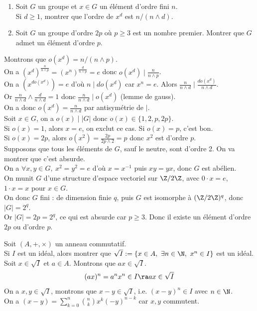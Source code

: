 \documentclass[11pt]{article}
\begin{document}
\begin{exercice}{}{}
    \begin{enumerate}
        \item Soit $G$ un groupe et $x\in G$ un élément d'ordre fini $n$.\\
        Si $d\geq1$, montrer que l'ordre de $x^d$ est $n/(n\land d)$.
        \item Soit $G$ un groupe d'ordre $2p$ où $p\geq3$ est un nombre premier. Montrer que $G$ admet un élément d'ordre $p$.
    \end{enumerate}
    \tcblower
     Montrons que $o(x^d) = n/(n\land p)$.\\
    On a $\left(x^d\right)^{\frac{n}{n\land p}} = (x^n)^{\frac{d}{n\land p}}=e$ donc $o(x^d) \mid \frac{n}{n\land p}$.\\
    On a $(x^{do(x^d)})=e$ d'où $n \mid do(x^d)$ car $x^{n}=e$. Alors $\frac{n}{n\land d}\mid \frac{do(x^d)}{n\land d}$.\\
    Or $\frac{n}{n\land d} \land \frac{d}{n\land d} = 1$ donc $\frac{n}{n\land d}\mid o(x^d)$ (lemme de gauss).\\
    On a donc $o(x^d)=\frac{n}{n\land d}$ par antisymétrie de $\mid$.\\
     Soit $x\in G$, on a $o(x)\mid|G|$ donc $o(x)\in\{1,2,p,2p\}$.\\
    Si $o(x)=1$, alors $x=e$, on exclut ce cas. Si $o(x)=p$, c'est bon.\\
    Si $o(x)=2p$, alors $o(x^2)=\frac{2p}{2p\land 2}=p$ donc $x^2$ est d'ordre $p$.\\
    Supposons que tous les éléments de $G$, sauf le neutre, sont d'ordre 2. On va montrer que c'est absurde.\\
    On a $\forall x,y\in G, ~ x^2=y^2=e$ d'où $x=x^{-1}$ puis $xy=yx$, donc $G$ est abélien.\\
    On munit $G$ d'une structure d'espace vectoriel sur $\Z/2\Z$, avec $0\cdot x = e$, $1\cdot x=x$ pour $x\in G$.\\
    On donc $G$ fini : de dimension finie $q$, puis $G$ est isomorphe à $(\Z/2\Z)^q$, donc $|G|=2^q$.\\
    Or $|G|=2p=2^q$, ce qui est absurde car $p\geq3$. Donc il existe un élément d'ordre $2p$ ou d'ordre $p$.  
\end{exercice}

\vspace*{-0.7cm}

\begin{exercice}{}{}
    Soit $(A,+,\times)$ un anneau commutatif.\\
    Si $I$ est un idéal, alors montrer que $\sqrt{I}:=\{x\in A, ~ \exists n \in \N, ~ x^n \in I\}$ est un idéal.
    \tcblower
    Soit $x \in \sqrt{I}$ et $a\in A$. Montrons que $ax\in\sqrt{I}$.
    \begin{equation*}
        (ax)^n = a^nx^n \in I \ra ax \in \sqrt{I}
    \end{equation*}
    On a $x,y\in\sqrt{I}$, montrons que $x-y\in\sqrt{I}$, i.e. $(x-y)^n\in I$ avec $n\in\N$.\\
    On a $(x-y)=\sum_{k=0}^n\binom{n}{k}x^k(-y)^{n-k}$ car $x,y$ commutent.
\end{exercice}
\end{document}
